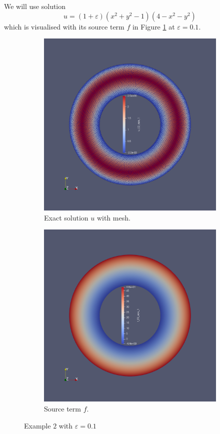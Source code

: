 \documentclass[12pt,a4paper]{article}
\begin{document}
We will use solution
\begin{equation}
u = (1+\varepsilon)(x^2 + y^2 -1)(4-x^2-y^2)
\end{equation}
which is visualised with its source term $f$ in Figure \ref{E2_uf} at $\varepsilon = 0.1$.
\begin{figure}[H]
 \begin{subfigure}{0.5\textwidth}
     \includegraphics[width=\textwidth]{Pics/uf/U_E2_eps_1.png}
     \caption{Exact solution $u$ with mesh.}
 \end{subfigure}
   \begin{subfigure}{0.5\textwidth}
     \includegraphics[width=\textwidth]{Pics/uf/F_E2_eps_1.png}
     \caption{Source term $f$.}
 \end{subfigure}
 \caption{Example $2$ with $\varepsilon = 0.1$} \label{E2_uf}
\end{figure}
\end{document}
